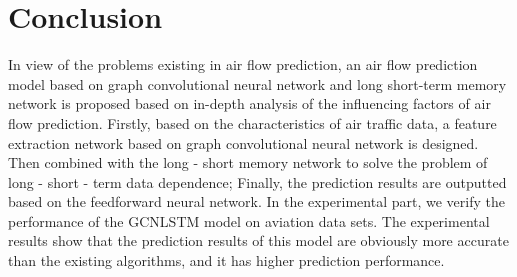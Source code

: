 \documentclass[journal,article,submit,moreauthors,pdftex]{Definitions/mdpi}
\begin{document}
\section{Conclusion}\label{sec:4}
In view of the problems existing in air flow prediction, an air flow prediction model based on graph convolutional neural network and long short-term memory network is proposed based on in-depth analysis of the influencing factors of air flow prediction. Firstly, based on the characteristics of air traffic data, a feature extraction network based on graph convolutional neural network is designed. Then combined with the long - short memory network to solve the problem of long - short - term data dependence; Finally, the prediction results are outputted based on the feedforward neural network. In the experimental part, we verify the performance of the GCNLSTM model on aviation data sets. The experimental results show that the prediction results of this model are obviously more accurate than the existing algorithms, and it has higher prediction performance.
\vspace{6pt} 



\end{document}
